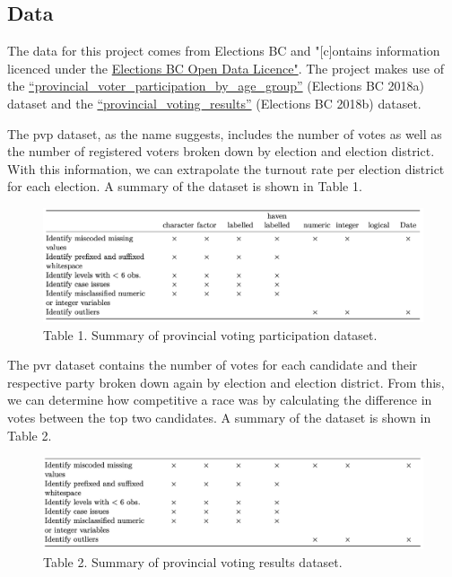 \documentclass[
]{article}
\begin{document}
\hypertarget{data}{%
\subsection{Data}\label{data}}

The data for this project comes from Elections BC and "{[}c{]}ontains
information licenced under the
\href{https://www.elections.bc.ca/docs/EBC-Open-Data-Licence.pdf}{Elections
BC Open Data Licence"}. The project makes use of the
\href{https://catalogue.data.gov.bc.ca/dataset/6d9db663-8c30-43ec-922b-d541d22e634f/resource/646530d4-078c-4815-8452-c75639962bb4}{``provincial\_voter\_participation\_by\_age\_group''}
(Elections BC 2018a) dataset and the
\href{https://catalogue.data.gov.bc.ca/dataset/44914a35-de9a-4830-ac48-870001ef8935/resource/fb40239e-b718-4a79-b18f-7a62139d9792}{``provincial\_voting\_results''}
(Elections BC 2018b) dataset.

The pvp dataset, as the name suggests, includes the number of votes as
well as the number of registered voters broken down by election and
election district. With this information, we can extrapolate the turnout
rate per election district for each election. A summary of the dataset
is shown in Table 1.

\begin{figure}
\includegraphics[width=1\linewidth]{../eda/bc_election_turnout_files/figure-html/pvp} \caption{Table 1. Summary of provincial voting participation dataset.}\label{fig:tab_1}
\end{figure}

The pvr dataset contains the number of votes for each candidate and
their respective party broken down again by election and election
district. From this, we can determine how competitive a race was by
calculating the difference in votes between the top two candidates. A
summary of the dataset is shown in Table 2.

\begin{figure}
\includegraphics[width=1\linewidth]{../eda/bc_election_turnout_files/figure-html/pvr} \caption{Table 2. Summary of provincial voting results dataset.}\label{fig:unnamed-chunk-1}
\end{figure}
\end{document}
